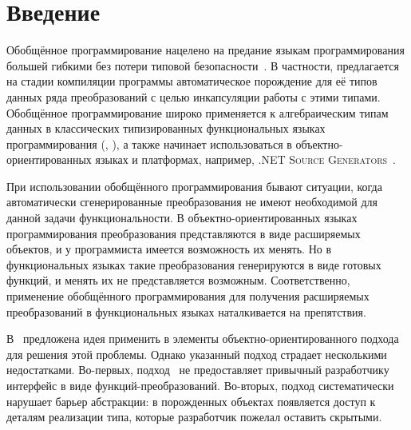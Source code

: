 \section{Введение}


Обобщённое программирование нацелено на предание  языкам программирования большей гибкими без потери  типовой безопасности~\cite{DGP}.
В частности, предлагается  на стадии компиляции программы автоматическое порождение   для её типов данных ряда преобразований с целью инкапсуляции работы с этими типами. Обобщённое программирование широко применяется  к алгебраическим типам данных в  классических типизированных функциональных языках программирования (\ocaml{}, \haskell{}), а также начинает использоваться в объектно-ориентированных языках и платформах, например, \textsc{.NET Source Generators}~\cite{dotNetSG}.

При использовании обобщённого программирования бывают ситуации, когда автоматически сгенерированные преобразования не имеют необходимой для данной задачи функциональности. В объектно-ориентированных языках программирования  преобразования представляются в виде расширяемых объектов, и у программиста имеется возможность их менять. Но в функциональных языках такие преобразования генерируются в виде готовых функций, и менять их не представляется возможным.  Соответственно, применение обобщённого программирования для получения расширяемых преобразований в функциональных языках наталкивается на препятствия.

В~\cite{Visitors} предложена идея применить в \ocaml{} %
 элементы объектно-ориентированного подхода для решения этой проблемы.%
Однако указанный подход страдает несколькими недостатками. Во-первых, 
подход~\cite{Visitors} не предоставляет привычный разработчику интерфейс в виде функций-преобразований. Во-вторых, подход систематически нарушает барьер абстракции: в порожденных объектах появляется доступ к деталям реализации типа, которые разработчик пожелал оставить скрытыми.



